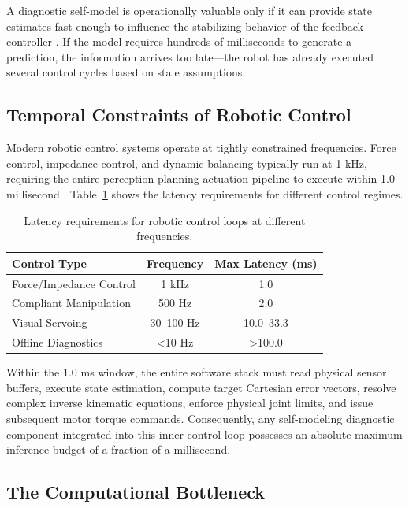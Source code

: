 \documentclass[12pt,a4paper,oneside]{report}
\begin{document}
A diagnostic self-model is operationally valuable only if it can provide state estimates fast enough to influence the stabilizing behavior of the feedback controller \cite{hu2024teaching, hu2025learning}. If the model requires hundreds of milliseconds to generate a prediction, the information arrives too late—the robot has already executed several control cycles based on stale assumptions.

\subsection{Temporal Constraints of Robotic Control}

Modern robotic control systems operate at tightly constrained frequencies. Force control, impedance control, and dynamic balancing typically run at 1 kHz, requiring the entire perception-planning-actuation pipeline to execute within 1.0 millisecond \cite{siciliano2009robotics}. Table~\ref{tab:control_loop_latency} shows the latency requirements for different control regimes.

\begin{table}[H]
\centering
\caption{Latency requirements for robotic control loops at different frequencies.}
\label{tab:control_loop_latency}
\begin{tabular}{lcc}
\toprule
\textbf{Control Type} & \textbf{Frequency} & \textbf{Max Latency (ms)} \\
\midrule
Force/Impedance Control & 1 kHz & 1.0 \\
Compliant Manipulation & 500 Hz & 2.0 \\
Visual Servoing & 30–100 Hz & 10.0–33.3 \\
Offline Diagnostics & <10 Hz & >100.0 \\
\bottomrule
\end{tabular}
\end{table}

Within the 1.0 ms window, the entire software stack must read physical sensor buffers, execute state estimation, compute target Cartesian error vectors, resolve complex inverse kinematic equations, enforce physical joint limits, and issue subsequent motor torque commands. Consequently, any self-modeling diagnostic component integrated into this inner control loop possesses an absolute maximum inference budget of a fraction of a millisecond.

\subsection{The Computational Bottleneck}
\end{document}
